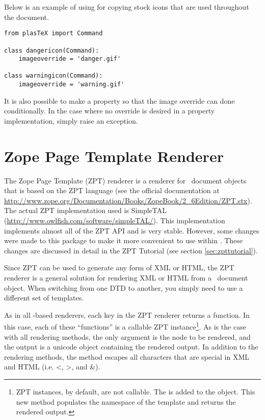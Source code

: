 Below is an example of using  for copying 
stock icons that are used throughout the document.
\begin{verbatim}
from plasTeX import Command

class dangericon(Command):
    imageoverride = 'danger.gif'

class warningicon(Command):
    imageoverride = 'warning.gif'
\end{verbatim}

It is also possible to make  a property
so that the image override can done conditionally.  In the case
where no override is desired in a property implementation, simply
raise an  exception.

\section{Zope Page Template Renderer\label{sec:zpt}}

The Zope Page Template (ZPT) renderer is a renderer for \plasTeX\ document
objects that is based on the ZPT language (see the official documentation at
\url{http://www.zope.org/Documentation/Books/ZopeBook/2_6Edition/ZPT.stx}).
The actual ZPT implementation used is SimpleTAL 
(\url{http://www.owlfish.com/software/simpleTAL/}).  This implementation
implements almost all of the ZPT API and is very stable.  However, some
changes were made to this package to make it more convenient to use
within \plasTeX.  These changes are discussed in detail in the 
ZPT Tutorial (see section \ref{sec:zpttutorial}).

Since ZPT can be used to generate any form of XML or HTML, the ZPT
renderer is a general solution for rendering XML or HTML from a 
\plasTeX\ document object.  When switching from one DTD to another, 
you simply need to use a different set of templates.

As in all -based renderers, each key in the ZPT renderer
returns a function.  In this case, each of these ``functions'' is a
callable ZPT instance\footnote{ZPT instances, by default, are not callable.
The  is added to the object.  This new method populates
the namespace of the template and returns the rendered output.}.  As is
the case with all rendering methods, the only argument is the node to be
rendered, and the output is a unicode object containing the rendered 
output. In addition to the rendering methods, the  method
escapes all characters that are special in XML and HTML (i.e. <, >, and \&).

